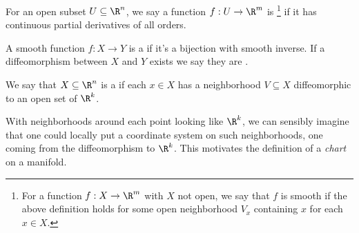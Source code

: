 \begin{definition}[Smooth]
    For an open subset $U \subseteq \R^n$, we say a function $f: U \rightarrow \R^m$ is \footnote{For a function $f: X \rightarrow \R^m$ with $X$ not open, we say that $f$ is smooth if the above definition holds for some open neighborhood $V_x$ containing $x$ for each $x \in X$.} if it has continuous partial derivatives of all orders. 
\end{definition}

\begin{definition}[Diffeomorphism]
    A smooth function $f: X \rightarrow Y$ is a  if it's a bijection with smooth inverse. If a diffeomorphism between $X$ and $Y$ exists we say they are .
\end{definition}

\begin{definition}[Manifold]
    We say that $X \subseteq \R^n$ is a  if each $x \in X$ has a neighborhood $V \subseteq X$ diffeomorphic to an open set of $\R^k$. 
\end{definition}

With neighborhoods around each point looking like $\R^k$, we can sensibly imagine that one could locally put a coordinate system on such neighborhoods, one coming from the diffeomorphism to $\R^k$. This motivates the definition of a \emph{chart} on a manifold.

